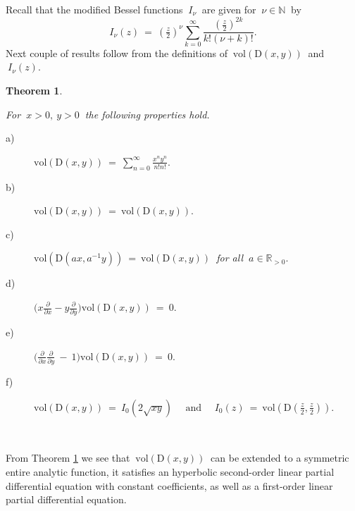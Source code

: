\documentclass[10pt,leqeq]{article}
\newtheorem{thm}{Theorem}%
\begin{document}
Recall that the modified Bessel functions $\ I_{\nu} \ $ are given 
for $\ \nu \in \mathbb{N} \ $ by
$$\displaystyle I_{\nu}\left(z\right)\ = \ (\tfrac{z}{2})^{\nu}\sum_{k=0}^{\infty}\frac{(\frac{z}
{2})^{2k}}{k!\left(\nu+k\right)!}.$$
Next couple of results follow from the definitions of 
$\ \mathrm{vol}(\mathrm{D}(x,y)) \ $ and $\ I_{\nu}\left(z\right).$\\

\begin{thm}\label{t2}
{\em For $\ x>0, \ y> 0 \ $ the following properties hold.
\begin{description}

   \item[a)] $\displaystyle \mathrm{vol}(\mathrm{D}(x,y))\ = \  \sum_{n=0}^{\infty}\frac{x^ny^n}{n!n!}.$
  \item[b)] $\mathrm{vol}(\mathrm{D}(x,y))\ = \ \mathrm{vol}(\mathrm{D}(x,y)).\ $
  \item[c)]$ \mathrm{vol}(\mathrm{D}(ax,a^{-1}y)) \ = \  \mathrm{vol}(\mathrm{D}(x,y)) \ $ for all $\ a\in \mathbb{R}_{>0}.$
  \item[d)] $\displaystyle \bigg(x\frac{\partial}{\partial x}-y\frac{\partial}{\partial y}\bigg) \mathrm{vol}(\mathrm{D}(x,y))\ = \ 0. $
  \item[e)] $\displaystyle  \bigg( \frac{\partial}{\partial x}\frac{\partial}{\partial y}\ - \ 1\bigg) \mathrm{vol}(\mathrm{D}(x,y))\ = \ 0.$
  \item[f)] $ \mathrm{vol}(\mathrm{D}(x,y)) \ = \  I_0(2\sqrt{xy}) \ \ \ \ \ \ 
  \mbox{and}\ \ \ \ \ \ I_0(z)\ = \ \mathrm{vol}(\mathrm{D}(\frac{z}{2},\frac{z}{2})). $
\end{description}
}
\end{thm}

\


From Theorem \ref{t2}  we see that $ \ \mathrm{vol}(\mathrm{D}(x,y)) \ $ can be extended to a symmetric entire analytic function, it satisfies an hyperbolic second-order linear partial differential equation with constant coefficients, as well as a first-order linear partial differential equation.\\
\end{document}
